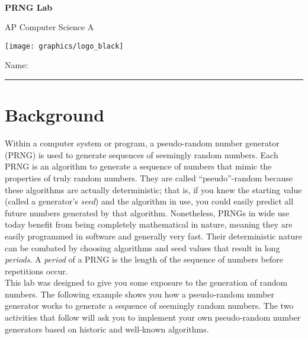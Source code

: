 

\def\LabCourse{AP Computer Science A}
\def\LabNumber{04}
\def\LabTitle{PRNG Lab}


	\begin{coverpages}
		\ \\[2cm]
		\begin{center}
			\huge
			\textbf{\LabTitle}

			\Large
			\LabCourse
		\end{center}

		\vspace{1.5cm}

		\begin{center}
			\texttt{[image: graphics/logo\_black]}

			\vspace{2.5cm}

			\Large
			Name: \rule{11.5cm}{0.1pt}
		\end{center}
	\end{coverpages}

	\thispagestyle{empty}
	\tableofcontents

	\pagebreak

	\section{Background}
		Within a computer system or program, a pseudo-random number generator (PRNG) is used to generate sequences of seemingly random numbers. Each PRNG is an algorithm to generate a sequence of numbers that mimic the properties of truly random numbers. They are called ``pseudo''-random because these algorithms are actually deterministic; that is, if you knew the starting value (called a generator's \emph{seed}) and the algorithm in use, you could easily predict all future numbers generated by that algorithm. Nonetheless, PRNGs in wide use today benefit from being completely mathematical in nature, meaning they are easily programmed in software and generally very fast. Their deterministic nature can be combated by choosing algorithms and seed values that result in long \emph{periods}. A \emph{period} of a PRNG is the length of the sequence of numbers before repetitions occur.\\[\baselineskip]
		This lab was designed to give you some exposure to the generation of random numbers. The following example shows you how a pseudo-random number generator works to generate a sequence of seemingly random numbers. The two activities that follow will ask you to implement your own pseudo-random number generators based on historic and well-known algorithms.

